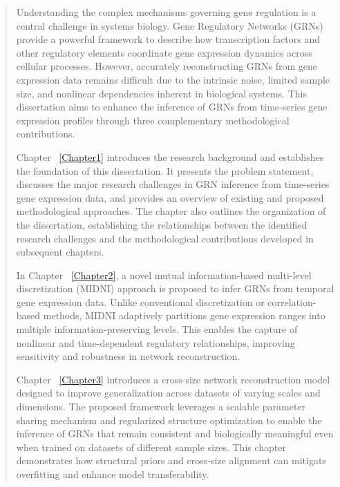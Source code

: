 \documentclass[
12pt, %
english, %
singlespacing, %
headsepline, %
]{MastersDoctoralThesis} %
\begin{document}

\begin{abstract}
\addchaptertocentry{\abstractname} %
Understanding the complex mechanisms governing gene regulation is a central challenge in systems biology. Gene Regulatory Networks (GRNs) provide a powerful framework to describe how transcription factors and other regulatory elements coordinate gene expression dynamics across cellular processes. However, accurately reconstructing GRNs from gene expression data remains difficult due to the intrinsic noise, limited sample size, and nonlinear dependencies inherent in biological systems. This dissertation aims to enhance the inference of GRNs from time-series gene expression profiles through three complementary methodological contributions.

Chapter ~\ref{Chapter1} introduces the research background and establishes the foundation of this dissertation. It presents the problem statement, discusses the major research challenges in GRN inference from time-series gene expression data, and provides an overview of existing and proposed methodological approaches. The chapter also outlines the organization of the dissertation, establishing the relationships between the identified research challenges and the methodological contributions developed in subsequent chapters.

In Chapter ~\ref{Chapter2}, a novel mutual information-based multi-level discretization (MIDNI) approach is proposed to infer GRNs from temporal gene expression data. Unlike conventional discretization or correlation-based methods, MIDNI adaptively partitions gene expression ranges into multiple information-preserving levels. This enables the capture of nonlinear and time-dependent regulatory relationships, improving sensitivity and robustness in network reconstruction.

Chapter ~\ref{Chapter3} introduces a cross-size network reconstruction model designed to improve generalization across datasets of varying scales and dimensions. The proposed framework leverages a scalable parameter sharing mechanism and regularized structure optimization to enable the inference of GRNs that remain consistent and biologically meaningful even when trained on datasets of different sample sizes. This chapter demonstrates how structural priors and cross-size alignment can mitigate overfitting and enhance model transferability.


\end{abstract}
\end{document}
